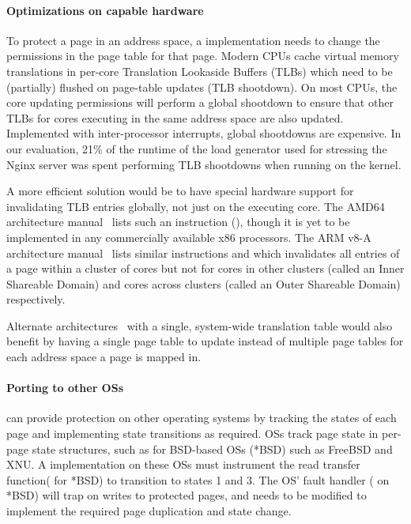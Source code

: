 \documentclass[letterpaper,twocolumn,10pt]{article}
\begin{document}
\paragraph{Optimizations on capable hardware}
To protect a page in an address space, a \midas implementation 
needs to change the permissions in the page table for that page.
Modern CPUs cache virtual memory translations in per-core 
Translation Lookaside Buffers (TLBs) which need to be (partially) 
flushed on page-table updates (TLB shootdown).
On most CPUs, the core updating permissions will perform a global 
shootdown to ensure that other TLBs for cores executing in the 
same address space are also updated.
Implemented with inter-processor interrupts, global shootdowns 
are expensive. 
In our evaluation, 21\% of the runtime of the load generator 
 used for stressing the Nginx server was spent
performing TLB shootdowns when running on the \midas kernel.

A more efficient solution would be to have special hardware support
for invalidating TLB entries globally, not just on the executing 
core. 
The AMD64 architecture manual~\cite{amd64prog} lists such an instruction 
(), though it is yet to be implemented in any commercially 
available x86 processors.
The ARM v8-A architecture manual~\cite{armv8a} lists similar instructions 
 and  which invalidates all entries 
of a page within a cluster of cores but not for cores in other clusters
(called an Inner Shareable Domain) and cores across clusters (called an 
Outer Shareable Domain) respectively.

Alternate architectures~\cite{guptarebooting,ChaseLFL94} with a single, 
system-wide translation table
would also benefit \midas by having a single page table to 
update instead of multiple page tables for each address space a page
is mapped in.

\paragraph{Porting to other OSs}
\midas can provide \tocttou protection on other operating systems by 
tracking the states of each page and implementing state transitions 
as required.
OSs track page state in per-page state structures,
such as  for BSD-based OSs (*BSD) such as FreeBSD and XNU.
A \midas implementation on these OSs must instrument the 
read transfer function( for *BSD) to transition to states 1 and 3.
The OS' fault handler ( on *BSD) will trap on writes to 
protected pages, and needs to be modified to implement the required page 
duplication and state change.
\end{document}
